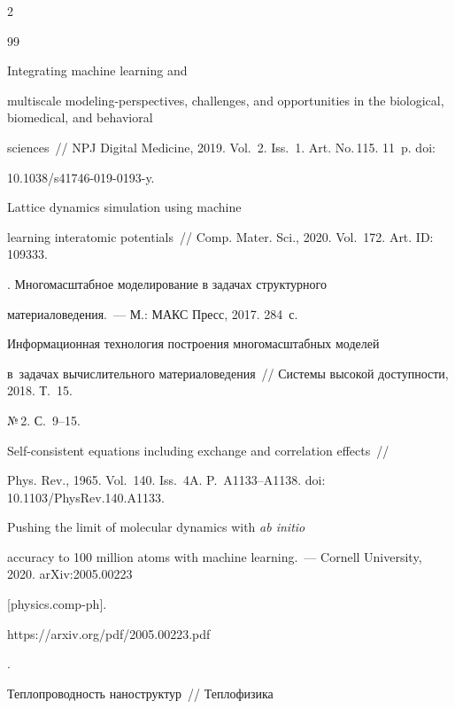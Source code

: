 \begin{multicols}{2}
{{\begin{thebibliography}{99}


      Integrating machine learning and 


multiscale modeling-perspectives, challenges, and opportunities in the biological, biomedical, and behavioral 


sciences~// NPJ Digital Medicine, 2019. Vol.~2. Iss.~1. Art. No.\,115. 11~p. doi:  


10.1038/s41746-019-0193-y.




      Lattice dynamics simulation using machine 


learning interatomic potentials~// Comp. Mater. Sci., 2020. Vol.~172. Art. ID: 109333.




. Многомасштабное моделирование в задачах структурного  


материаловедения.~--- М.: МАКС Пресс, 2017. 284~с.




      Информационная технология по\-стро\-ения многомасштабных моделей 


     в~задачах вычислительного материаловедения~// Системы высокой доступности, 2018. Т.~15. 


№\,2. С.~9--15.




      Self-consistent equations including exchange and correlation effects~// 


Phys. Rev., 1965. Vol.~140. Iss.~4A. P.~A1133--A1138. doi: 10.1103/\mbox{PhysRev}.140.A1133.






     Pushing the limit of molecular dynamics with \textit{ab initio} 


accuracy to 100 million atoms with machine learning.~--- Cornell University, 2020. arXiv:2005.00223 


[physics.comp-ph]. {\sf 


https://arxiv.org/pdf/2005.00223.pdf}.




      Теплопроводность наноструктур~// Теплофизика 



\end{thebibliography}}}
\end{multicols}
